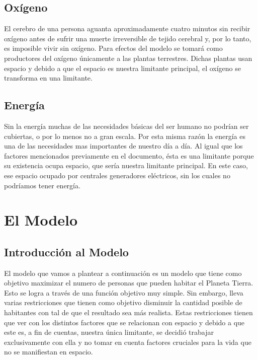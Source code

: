 \documentclass[12pt]{report}
\begin{document}
\subsection*{Ox\'igeno}
El cerebro de una persona aguanta aproximadamente cuatro minutos sin recibir ox\'igeno antes de sufrir una muerte irreversible de tejido cerebral y, por lo tanto, es imposible vivir sin ox\'igeno. Para efectos del modelo se tomar\'a como productores del ox\'igeno \'unicamente a las plantas terrestres. Dichas plantas usan espacio y debido a que el espacio es nuestra limitante principal, el ox\'igeno se transforma en una limitante. 

\subsection*{Energ\'ia}
Sin la energ\'ia muchas de las necesidades b\'asicas del ser humano no podr\'ian ser cubiertas, o por lo menos no a gran escala. Por esta misma raz\'on la energ\'ia es una de las necesidades mas importantes de nuestro d\'ia a d\'ia. Al igual que los factores mencionados previamente en el documento, \'esta es una limitante porque su existencia ocupa espacio, que ser\'ia nuestra limitante principal. En este caso, ese espacio ocupado por centrales generadores el\'ectricos, sin los cuales no podr\'iamos tener energ\'ia.



\section*{El Modelo}

\subsection*{Introducci\'on al Modelo}
El modelo que vamos a plantear a continuaci\'on es un modelo que tiene como objetivo maximizar el numero de personas que pueden habitar el Planeta Tierra. Esto se logra a trav\'es de una funci\'on objetivo muy simple. Sin embargo, lleva varias restricciones que tienen como objetivo disminuir la cantidad posible de habitantes con tal de que el resultado sea m\'as realista. Estas restricciones tienen que ver con los distintos factores que se relacionan con espacio y debido a que este es, a fin de cuentas, nuestra \'unica limitante, se decidi\'o trabajar exclusivamente con ella y no tomar en cuenta factores cruciales para la vida que no se manifiestan en espacio.
\end{document}
